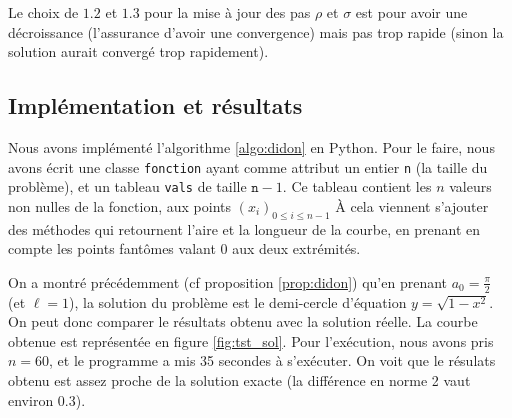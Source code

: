\documentclass[10pt,a4paper]{article}
\theoremstyle{plain}
\theoremstyle{definition}
\begin{document}
Le choix de $1.2$ et $1.3$ pour la mise à jour des pas $\rho$ et $\sigma$ est pour avoir une décroissance (l'assurance d'avoir une convergence) mais pas trop rapide (sinon la solution aurait convergé trop rapidement).




\subsection{Implémentation et résultats}

Nous avons implémenté l'algorithme \ref{algo:didon} en Python. Pour le faire, nous avons écrit une classe \texttt{fonction} ayant comme attribut un entier \texttt{n} (la taille du problème), et un tableau \texttt{vals} de taille $\texttt{n}-1$. Ce tableau contient les $n$ valeurs non nulles de la fonction, aux points $(x_i)_{0\leqslant i\leqslant n-1}$ À cela viennent s'ajouter des méthodes qui retournent l'aire et la longueur de la courbe, en prenant en compte les points \og fantômes \fg{} valant 0 aux deux extrémités.

\vspace*{\baselineskip}

On a montré précédemment (cf proposition \ref{prop:didon}) qu'en prenant $a_0=\frac{\pi}{2}$ (et $\ell=1$), la solution du problème est le demi-cercle d'équation $y=\sqrt{1-x^2}$. On peut donc comparer le résultats obtenu avec la solution réelle. La courbe obtenue est représentée en figure \ref{fig:tst_sol}. Pour l'exécution, nous avons pris $n=60$, et le programme a mis 35 secondes à s'exécuter. On voit que le résulats obtenu est assez proche de la solution exacte (la différence en norme 2 vaut environ 0.3).
\end{document}
